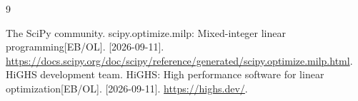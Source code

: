 \begin{thebibliography}{9}
\raggedright
{} The SciPy community. scipy.optimize.milp: Mixed-integer linear programming[EB/OL]. [2026-09-11]. \url{https://docs.scipy.org/doc/scipy/reference/generated/scipy.optimize.milp.html}.
 HiGHS development team. HiGHS: High performance software for linear optimization[EB/OL]. [2026-09-11]. \url{https://highs.dev/}.
\end{thebibliography}
